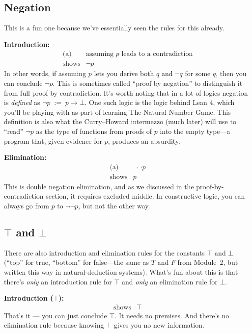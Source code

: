 \documentclass[11pt]{article}
\begin{document}
\subsection{Negation}

This is a fun one because we've essentially seen the rules for this already.

\noindent\textbf{Introduction:}
\[
  \begin{array}{rl}
    \text{(a)} & \text{assuming $p$ leads to a contradiction} \\
    \hline
    \text{shows} & \lnot p
  \end{array}
\]
In other words, if assuming $p$ lets you derive both $q$ and $\lnot q$ for some $q$, then you can conclude $\lnot p$. This is sometimes called ``proof by negation'' to distinguish it from full proof by contradiction.
It's worth noting that in a lot of logics negation is \emph{defined} as $\lnot p \;:=\; p \to \bot$. One such logic is the logic behind Lean 4, which you'll be playing with as part of learning The Natural Number Game. This definition is also what the Curry--Howard intermezzo (much later) will use to ``read'' $\lnot p$ as the type of functions from proofs of $p$ into the empty type---a program that, given evidence for $p$, produces an absurdity.

\noindent\textbf{Elimination:}
\[
  \begin{array}{rl}
    \text{(a)} & \lnot \lnot p \\
    \hline
    \text{shows} & p
  \end{array}
\]
This is double negation elimination, and as we discussed in the proof-by-contradiction section, it requires excluded middle. In constructive logic, you can always go from $p$ to $\lnot\lnot p$, but not the other way.

\subsection{\texorpdfstring{$\top$ and $\bot$}{Top and bottom}}

There are also introduction and elimination rules for the constants $\top$ and $\bot$ (``top'' for true, ``bottom'' for false---the same as $T$ and $F$ from Module~2, but written this way in natural-deduction systems). What's fun about this is that there's \emph{only} an introduction rule for $\top$ and \emph{only} an elimination rule for $\bot$.

\noindent\textbf{Introduction ($\top$):}
\[
  \begin{array}{rl}
    \hline
    \text{shows} & \top
  \end{array}
\]
That's it --- you can just conclude $\top$. It needs no premises. And there's no elimination rule because knowing $\top$ gives you no new information.
\end{document}
